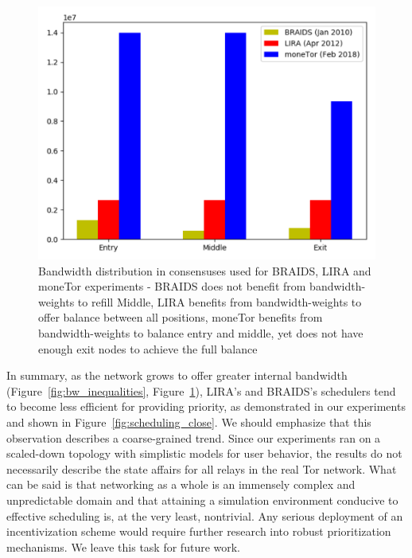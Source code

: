 \begin{figure}
	\centering \includegraphics[scale=0.415]{images/bw_analysis_comp.pdf}
  \caption{Bandwidth distribution in consensuses used for BRAIDS, LIRA and moneTor experiments - BRAIDS does not benefit from bandwidth-weights to refill Middle, LIRA benefits from bandwidth-weights to offer balance between all positions, moneTor benefits from bandwidth-weights to balance entry and middle, yet does not have enough exit nodes to achieve the full balance}
  \label{fig:bw_comp}
\end{figure}
 
In summary, as the network grows to offer greater internal bandwidth (Figure~\ref{fig:bw_inequalities}, Figure~\ref{fig:bw_comp}), LIRA's and BRAIDS's schedulers tend to become less efficient for providing priority, as demonstrated in our experiments and shown in Figure~\ref{fig:scheduling_close}.
We should emphasize that this observation describes a coarse-grained trend.
Since our experiments ran on a scaled-down topology with simplistic models for user behavior, the results do not necessarily describe the state affairs for all relays in the real Tor network.
What can be said is that networking as a whole is an immensely complex and unpredictable domain and that attaining a simulation environment conducive to effective scheduling is, at the very least, nontrivial.
Any serious deployment of an incentivization scheme would require further research into robust prioritization mechanisms.
We leave this task for future work.
